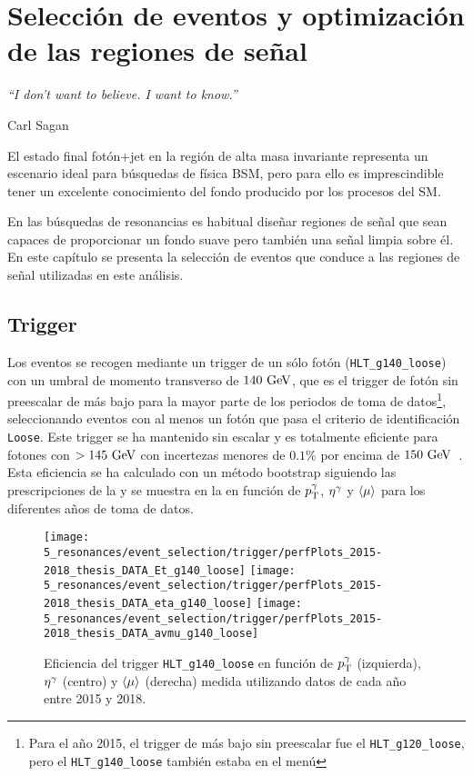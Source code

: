 \chapter{Selección de eventos y optimización de las regiones de señal}
\label{ch:evt_selection}
\epigraph{\emph{``I don't want to believe. I want to know.”}}{Carl Sagan}

El estado final fotón+jet en la región de alta masa invariante representa un escenario ideal para búsquedas de física \ac{BSM}, pero para ello es imprescindible tener un excelente conocimiento del fondo producido por los procesos del \ac{SM}.

En las búsquedas de resonancias es habitual diseñar regiones de señal que sean capaces de proporcionar un fondo suave pero también una señal limpia sobre él. En este capítulo se presenta la selección de eventos que conduce a las regiones de señal utilizadas en este análisis.


\section{Trigger}
\label{sec:evt_selection:trigger}

Los eventos se recogen mediante un trigger de un sólo fotón (\texttt{HLT\_g140\_loose}) con un umbral de momento transverso de \(140~\text{GeV}\), que es el trigger de fotón sin preescalar de más bajo \pt para la mayor parte de los periodos de toma de datos\footnote{Para el año 2015, el trigger de más bajo \pt sin preescalar fue el \texttt{HLT\_g120\_loose}, pero el \texttt{HLT\_g140\_loose} también estaba en el menú}, seleccionando eventos con al menos un fotón que pasa el criterio de identificación \texttt{Loose}. Este trigger se ha mantenido sin escalar y es totalmente eficiente para fotones con \(>145~\text{GeV}\) con incertezas menores de \(0.1\%\) por encima de \(150~\text{GeV}\)~\cite{ATLAS-EGammaTrigger-Performance-Run2}. Esta eficiencia se ha calculado con un método bootstrap siguiendo las prescripciones de la  y se muestra en la \Fig{\ref{fig:evt_selection:trigger:trigger_perf_15_18}} en función de \(p_{\text{T}}^{\gamma}\), \(\eta^{\gamma}\) y \(\langle \mu \rangle\) para los diferentes años de toma de datos.

\begin{figure}[ht!]
    \centering
    \texttt{[image: 5\_resonances/event\_selection/trigger/perfPlots\_2015-2018\_thesis\_DATA\_Et\_g140\_loose]}
    \texttt{[image: 5\_resonances/event\_selection/trigger/perfPlots\_2015-2018\_thesis\_DATA\_eta\_g140\_loose]}
    \texttt{[image: 5\_resonances/event\_selection/trigger/perfPlots\_2015-2018\_thesis\_DATA\_avmu\_g140\_loose]}
    \caption{Eficiencia del trigger \texttt{HLT\_g140\_loose} en función de \(p_{\text{T}}^{\gamma}\) (izquierda), \(\eta^{\gamma}\) (centro) y \(\langle \mu \rangle\) (derecha) medida utilizando datos de cada año entre 2015 y 2018.}
    \label{fig:evt_selection:trigger:trigger_perf_15_18}
\end{figure}








